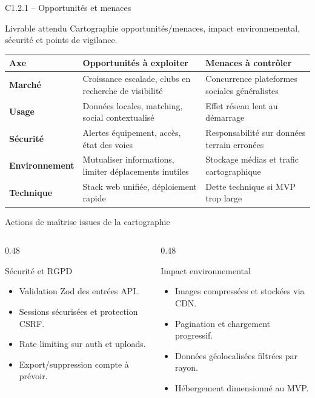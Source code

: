 \documentclass[aspectratio=169,11pt]{beamer}
\newcommand{\competence}[2]{%
  \begin{block}{#1}
    #2
  \end{block}
}
\begin{document}
\begin{frame}{C1.2.1 -- Opportunités et menaces}
  \competence{Livrable attendu}{Cartographie opportunités/menaces, impact environnemental, sécurité et points de vigilance.}
  \small
  \begin{tabularx}{\textwidth}{>{\bfseries}p{2.4cm} X X}
    Axe & Opportunités à exploiter & Menaces à contrôler \\
    \hline
    Marché & Croissance escalade, clubs en recherche de visibilité & Concurrence plateformes sociales généralistes \\
    Usage & Données locales, matching, social contextualisé & Effet réseau lent au démarrage \\
    Sécurité & Alertes équipement, accès, état des voies & Responsabilité sur données terrain erronées \\
    Environnement & Mutualiser informations, limiter déplacements inutiles & Stockage médias et trafic cartographique \\
    Technique & Stack web unifiée, déploiement rapide & Dette technique si MVP trop large \\
  \end{tabularx}
\end{frame}

\begin{frame}{Actions de maîtrise issues de la cartographie}
  \begin{columns}[T]
    \begin{column}{0.48\textwidth}
      \begin{block}{Sécurité et RGPD}
        \begin{itemize}
          \item Validation Zod des entrées API.
          \item Sessions sécurisées et protection CSRF.
          \item Rate limiting sur auth et uploads.
          \item Export/suppression compte à prévoir.
        \end{itemize}
      \end{block}
    \end{column}
    \begin{column}{0.48\textwidth}
      \begin{block}{Impact environnemental}
        \begin{itemize}
          \item Images compressées et stockées via CDN.
          \item Pagination et chargement progressif.
          \item Données géolocalisées filtrées par rayon.
          \item Hébergement dimensionné au MVP.
        \end{itemize}
      \end{block}
    \end{column}
  \end{columns}
\end{frame}
\end{document}
